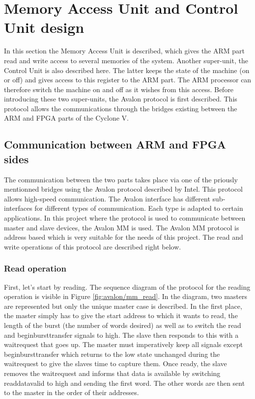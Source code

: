 \chapter{Memory Access Unit and Control Unit design}

In this section the Memory Access Unit is described, which gives the ARM part read and write 
access to several memories of the system. Another super-unit, the Control Unit is also described here. 
The latter keeps the state of the machine (on or off) and gives access to this register to the 
ARM part. The ARM processor can therefore switch the machine on and off as it wishes from this 
access. Before introducing these two super-units, the Avalon protocol is first described. This 
protocol allows the communications through the bridges existing between the ARM and FPGA parts of
the Cyclone V.

\section{Communication between ARM and FPGA sides}

The communication between the two parts takes place via one of the priously mentionned bridges using 
the Avalon protocol described by Intel. This protocol allows 
high-speed communication. The Avalon interface has different sub-interfaces for different types 
of communication. Each type is adapted to certain applications. In this project where the protocol 
is used to communicate between master and slave devices, the Avalon MM is used. 
The Avalon MM protocol is address based which is very suitable for the needs of this project.
The read and write operations of this protocol are described right below.

\subsection{Read operation}

First, let's start by reading. The sequence diagram of the protocol for the reading operation is 
visible in Figure \ref{fig:avalon/mm_read}. In the diagram, two masters are represented but only 
the unique master case is described. In the first place, the master simply has to give
the start address to which it wants to read, the length of the burst (the number of words desired) 
as well as to switch the read and beginbursttransfer signals to high. The slave then responds 
to this with a waitrequest that goes up. The master must imperatively keep all signals except 
beginbursttransfer which returns to the low state unchanged during the waitrequest to give the 
slaves time to capture them. Once ready, the slave removes the waitrequest and informs that  
data is available by switching readdatavalid to high and sending the first word. The other words 
are then sent to the master in the order of their addresses. 

